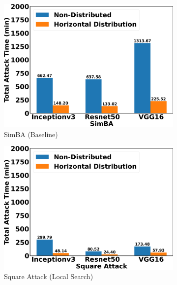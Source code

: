 \begin{figure}[tbp]
\centering
\begin{subfigure}[b]{0.6\textwidth}
    \centering
    \includegraphics[width=\textwidth]{figures/chapter_classification/simba_attack_horizontal_time.png}
    \caption{SimBA (Baseline)}
    \label{fig:simba_horizon}
\end{subfigure}
\hfill
\begin{subfigure}[b]{0.6\textwidth}
    \centering
    \includegraphics[width=\textwidth]{figures/chapter_classification/square_attack_horizontal_time.png}
    \caption{Square Attack (Local Search)}
    \label{fig:square_horizon}
\end{subfigure}
\hfill
\begin{subfigure}[b]{0.6\textwidth}

\end{subfigure}
\end{figure}
